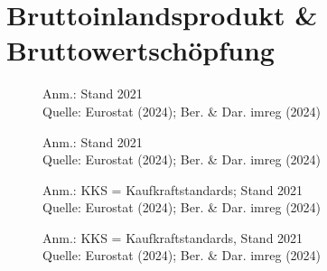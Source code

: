 

\section{Bruttoinlandsprodukt \& Bruttowertschöpfung}



\begin{figure}[p]
	{\centering {}}
	\label{map:bip}
	\begin{spacing}{1} \scriptsize
		Anm.: Stand 2021\\
		Quelle: Eurostat (2024); Ber. \& Dar. imreg (2024) \end{spacing}
\end{figure}


\begin{figure}[p]
	{\centering {}}
	\label{map:bippc}
	\begin{spacing}{1} \scriptsize
		Anm.: Stand 2021\\
		Quelle: Eurostat (2024); Ber. \& Dar. imreg (2024) \end{spacing}
\end{figure}


\begin{figure}[p]
	{\centering {}}
	\label{map:bipkks}
	\begin{spacing}{1} \scriptsize
		Anm.: KKS = Kaufkraftstandards; Stand 2021\\
		Quelle: Eurostat (2024); Ber. \& Dar. imreg (2024) \end{spacing}
\end{figure}


\begin{figure}[p]
	{\centering {}}
	\label{map:bipkkspc}
	\begin{spacing}{1} \scriptsize
		Anm.: KKS = Kaufkraftstandards, Stand 2021\\
		Quelle: Eurostat (2024); Ber. \& Dar. imreg (2024) \end{spacing}
\end{figure}


